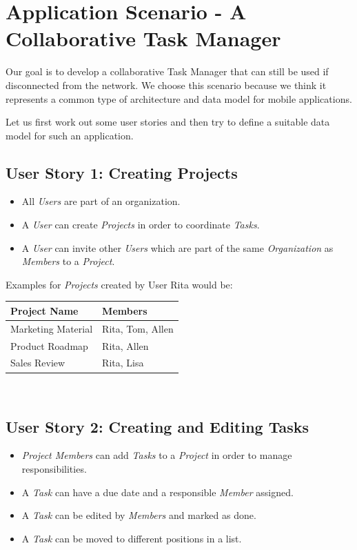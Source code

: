 
\chapter{Application Scenario - A Collaborative Task Manager}
\label{sec:scenario}

Our goal is to develop a collaborative Task Manager that can still be used if disconnected from the network.
We choose this scenario because we think it represents a common type of architecture and data model for mobile applications.

Let us first work out some user stories and then try to define a suitable data model for such an application.

\section{User Story 1: Creating Projects}
\begin{itemize}
\item All \emph{Users} are part of an organization.
\item A \emph{User} can create \emph{Projects} in order to coordinate \emph{Tasks}.
\item A \emph{User} can invite other \emph{Users} which are part of the same \emph{Organization} as \emph{Members} to a \emph{Project}.
\end{itemize}

Examples for \emph{Projects} created by User Rita would be:\\

\begin{tabular}{ l l }
Project Name & Members \\
\hline
Marketing Material & Rita, Tom, Allen \\
Product Roadmap & Rita, Allen \\
Sales Review & Rita, Lisa
\end{tabular}\\

\section{User Story 2: Creating and Editing Tasks}
\begin{itemize}
\item \emph{Project Members} can add \emph{Tasks} to a \emph{Project} in order to manage responsibilities.
\item A \emph{Task} can have a due date and a responsible \emph{Member} assigned.
\item A \emph{Task} can be edited by \emph{Members} and marked as done.
\item A \emph{Task} can be moved to different positions in a list.
\end{itemize}

